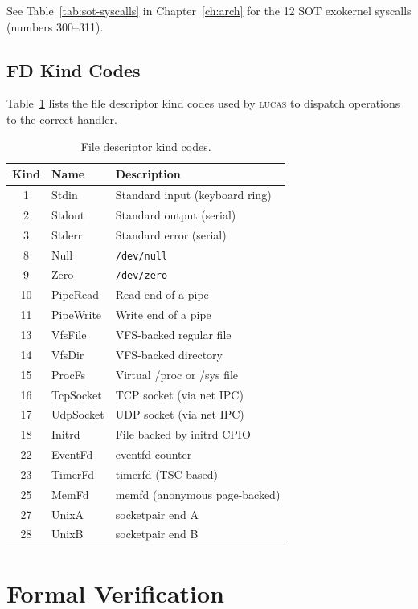 \documentclass[11pt,a4paper,twoside]{report}
\theoremstyle{definition}
\newcommand{\LUCAS}{\textsc{lucas}}
\begin{document}
See Table~\ref{tab:sot-syscalls} in Chapter~\ref{ch:arch} for the 12 SOT
exokernel syscalls (numbers 300--311).

\section{FD Kind Codes}

Table~\ref{tab:fd-kinds} lists the file descriptor kind codes used by
\LUCAS{} to dispatch operations to the correct handler.

\begin{table}[H]
\centering
\caption{File descriptor kind codes.}
\label{tab:fd-kinds}
\begin{tabular}{c l l}
\toprule
\textbf{Kind} & \textbf{Name} & \textbf{Description} \\
\midrule
1  & Stdin      & Standard input (keyboard ring) \\
2  & Stdout     & Standard output (serial) \\
3  & Stderr     & Standard error (serial) \\
8  & Null       & \texttt{/dev/null} \\
9  & Zero       & \texttt{/dev/zero} \\
10 & PipeRead   & Read end of a pipe \\
11 & PipeWrite  & Write end of a pipe \\
13 & VfsFile    & VFS-backed regular file \\
14 & VfsDir     & VFS-backed directory \\
15 & ProcFs     & Virtual /proc or /sys file \\
16 & TcpSocket  & TCP socket (via net IPC) \\
17 & UdpSocket  & UDP socket (via net IPC) \\
18 & Initrd     & File backed by initrd CPIO \\
22 & EventFd    & eventfd counter \\
23 & TimerFd    & timerfd (TSC-based) \\
25 & MemFd      & memfd (anonymous page-backed) \\
27 & UnixA      & socketpair end A \\
28 & UnixB      & socketpair end B \\
\bottomrule
\end{tabular}
\end{table}


\chapter{Formal Verification}
\label{ch:formal}
\end{document}
